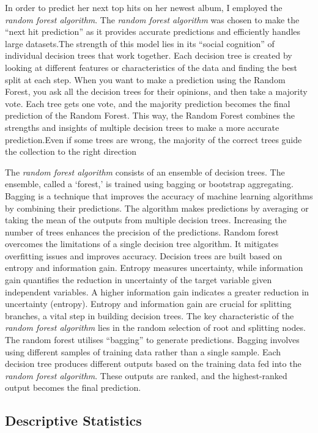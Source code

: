 \documentclass[11pt,preprint, authoryear]{elsarticle}
\numberwithin{equation}{section}
\numberwithin{figure}{section}
\numberwithin{table}{section}
\begin{document}
In order to predict her next top hits on her newest album, I employed
the \emph{random forest algorithm}. The \emph{random forest algorithm}
was chosen to make the ``next hit prediction'' as it provides accurate
predictions and efficiently handles large datasets.The strength of this
model lies in its ``social cognition'' of individual decision trees that
work together. Each decision tree is created by looking at different
features or characteristics of the data and finding the best split at
each step. When you want to make a prediction using the Random Forest,
you ask all the decision trees for their opinions, and then take a
majority vote. Each tree gets one vote, and the majority prediction
becomes the final prediction of the Random Forest. This way, the Random
Forest combines the strengths and insights of multiple decision trees to
make a more accurate prediction.Even if some trees are wrong, the
majority of the correct trees guide the collection to the right
direction

The \emph{random forest algorithm} consists of an ensemble of decision
trees. The ensemble, called a `forest,' is trained using bagging or
bootstrap aggregating. Bagging is a technique that improves the accuracy
of machine learning algorithms by combining their predictions. The
algorithm makes predictions by averaging or taking the mean of the
outputs from multiple decision trees. Increasing the number of trees
enhances the precision of the predictions. Random forest overcomes the
limitations of a single decision tree algorithm. It mitigates
overfitting issues and improves accuracy. Decision trees are built based
on entropy and information gain. Entropy measures uncertainty, while
information gain quantifies the reduction in uncertainty of the target
variable given independent variables. A higher information gain
indicates a greater reduction in uncertainty (entropy). Entropy and
information gain are crucial for splitting branches, a vital step in
building decision trees. The key characteristic of the \emph{random
forest algorithm} lies in the random selection of root and splitting
nodes. The random forest utilises ``bagging'' to generate predictions.
Bagging involves using different samples of training data rather than a
single sample. Each decision tree produces different outputs based on
the training data fed into the \emph{random forest algorithm}. These
outputs are ranked, and the highest-ranked output becomes the final
prediction.

\hypertarget{descriptive-statistics}{%
\subsection*{Descriptive Statistics}\label{descriptive-statistics}}
\end{document}
